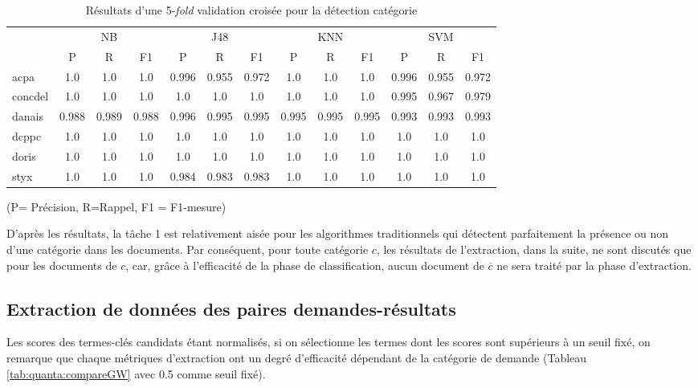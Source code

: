 \begin{table}[!h]
	\scriptsize
	\centering
	\begin{tabular}{l|ccc|ccc|ccc|ccc}
		\hline\noalign{\smallskip}
		&   \multicolumn{3}{|c|}{NB}    &    \multicolumn{3}{|c|}{J48}   &  \multicolumn{3}{|c|}{KNN}  & \multicolumn{3}{|c}{SVM}     \\       
		\noalign{\smallskip}
		\hline
		\noalign{\smallskip}
		& P     & R     & F1    & P     & R     & F1    & P     & R     & F1    & P     & R     & F1    \\        
		\noalign{\smallskip}
		\hline
		\noalign{\smallskip}
		acpa    & 1.0 & 1.0 & 1.0 & 0.996 & 0.955 & 0.972 & 1.0 & 1.0 & 1.0 & 0.996 & 0.955 & 0.972 \\
		concdel & 1.0 & 1.0 & 1.0 & 1.0 & 1.0 & 1.0 & 1.0 & 1.0 & 1.0 & 0.995 & 0.967 & 0.979 \\
		danais  & 0.988 & 0.989 & 0.988 & 0.996 & 0.995 & 0.995 & 0.995 & 0.995 & 0.995 & 0.993 & 0.993 & 0.993 \\
		dcppc   & 1.0 & 1.0 & 1.0 & 1.0 & 1.0 & 1.0 & 1.0 & 1.0 & 1.0 & 1.0 & 1.0 & 1.0 \\
		doris   & 1.0 & 1.0 & 1.0 & 1.0 & 1.0 & 1.0 & 1.0 & 1.0 & 1.0 & 1.0 & 1.0 & 1.0 \\
		styx    & 1.0 & 1.0 & 1.0 & 0.984 & 0.983 & 0.983 & 1.0 & 1.0 & 1.0 & 1.0 & 1.0 & 1.0 \\
		\hline
	\end{tabular}
(P= Précision, R=Rappel, F1 = F1-mesure)
	\caption{Résultats d'une 5-\textit{fold} validation croisée pour la détection catégorie }\label{tab:quanta:resultat-detect-cat}
\end{table}

D'après les résultats, la tâche 1 est relativement aisée pour les algorithmes traditionnels qui détectent parfaitement la présence ou non d'une catégorie dans les documents. Par conséquent, pour toute catégorie $c$, les résultats de l'extraction, dans la suite, ne sont discutés que pour les documents de $c$, car, grâce à l'efficacité de la phase de classification, aucun document de $\overline{c}$ ne sera traité par la phase d'extraction.

\subsection{Extraction de données des paires demandes-résultats}
Les scores des termes-clés candidats étant normalisés, si on sélectionne les termes dont les scores sont supérieurs à un seuil fixé, on remarque que chaque métriques d'extraction ont un degré d'efficacité dépendant de la catégorie de demande (Tableau \ref{tab:quanta:compareGW} avec 0.5 comme  seuil fixé). 

